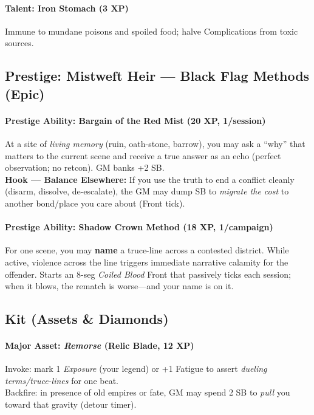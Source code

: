 \paragraph{Talent: Iron Stomach (3 XP)}
Immune to mundane poisons and spoiled food; halve Complications from toxic sources.

\subsection{Prestige: Mistweft Heir --- Black Flag Methods (Epic)}
\paragraph{Prestige Ability: Bargain of the Red Mist (20 XP, 1/session)}
At a site of \emph{living memory} (ruin, oath-stone, barrow), you may ask a ``why'' that matters to the current scene and receive a true answer as an echo (perfect observation; no retcon). GM banks +2 SB. \\
\textbf{Hook --- Balance Elsewhere:} If you use the truth to end a conflict cleanly (disarm, dissolve, de-escalate), the GM may dump SB to \emph{migrate the cost} to another bond/place you care about (Front tick).

\paragraph{Prestige Ability: Shadow Crown Method (18 XP, 1/campaign)}
For one scene, you may \textbf{name} a truce-line across a contested district. While active, violence across the line triggers immediate narrative calamity for the offender. Starts an 8-seg \emph{Coiled Blood} Front that passively ticks each session; when it blows, the rematch is worse---and your name is on it.

\subsection{Kit (Assets \& Diamonds)}
\paragraph{Major Asset: \emph{Remorse} (Relic Blade, 12 XP)}
Invoke: mark 1 \emph{Exposure} (your legend) or +1 Fatigue to assert \emph{dueling terms/truce-lines} for one beat. \\
Backfire: in presence of old empires or fate, GM may spend 2 SB to \emph{pull} you toward that gravity (detour timer).

